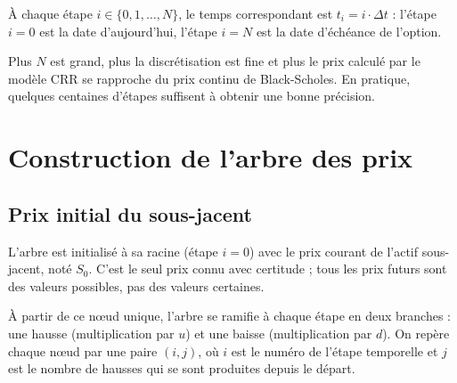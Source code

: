 \documentclass[11pt]{report}
\begin{document}
À chaque étape $i \in \{0, 1, \ldots, N\}$, le temps correspondant est
$t_i = i \cdot \Delta t$ : l'étape $i = 0$ est la date d'aujourd'hui,
l'étape $i = N$ est la date d'échéance de l'option.

Plus $N$ est grand, plus la discrétisation est fine et plus le prix calculé
par le modèle CRR se rapproche du prix continu de Black-Scholes. En pratique,
quelques centaines d'étapes suffisent à obtenir une bonne précision.

\section{Construction de l'arbre des prix}

\subsection{Prix initial du sous-jacent}

L'arbre est initialisé à sa racine (étape $i = 0$) avec le prix courant
de l'actif sous-jacent, noté $S_0$. C'est le seul prix connu avec certitude ;
tous les prix futurs sont des valeurs possibles, pas des valeurs certaines.

À partir de ce nœud unique, l'arbre se ramifie à chaque étape en deux
branches : une hausse (multiplication par $u$) et une baisse (multiplication
par $d$). On repère chaque nœud par une paire $(i, j)$, où $i$ est le numéro
de l'étape temporelle et $j$ est le nombre de hausses qui se sont produites
depuis le départ.

\medskip

\noindent{}
\end{document}
